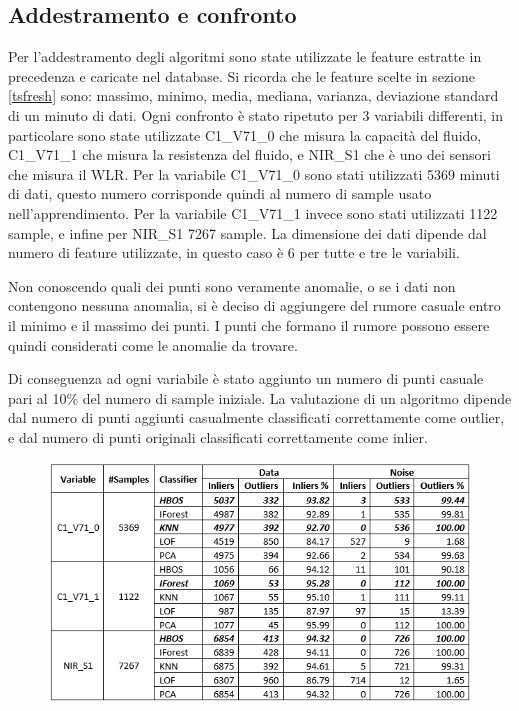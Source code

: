 \subsection{Addestramento e confronto} \label{AddestramentoEConfronto}

Per l'addestramento degli algoritmi sono state utilizzate le feature estratte in precedenza e caricate nel database. Si ricorda che le feature scelte in sezione \ref{tsfresh} sono: massimo, minimo, media, mediana, varianza, deviazione standard di un minuto di dati. Ogni confronto è stato ripetuto per 3 variabili differenti, in particolare sono state utilizzate C1\_V71\_0 che misura la capacità del fluido, C1\_V71\_1 che misura la resistenza del fluido, e NIR\_S1 che è uno dei sensori che misura il WLR.
Per la variabile C1\_V71\_0 sono stati utilizzati 5369 minuti di dati, questo numero corrisponde quindi al numero di sample usato nell'apprendimento. Per la variabile C1\_V71\_1 invece sono stati utilizzati 1122 sample, e infine per NIR\_S1 7267 sample.
La dimensione dei dati dipende dal numero di feature utilizzate, in questo caso è 6 per tutte e tre le variabili.

Non conoscendo quali dei punti sono veramente anomalie, o se i dati non contengono nessuna anomalia, si è deciso di aggiungere del rumore casuale entro il minimo e il massimo dei punti. I punti che formano il rumore possono essere quindi considerati come le anomalie da trovare. 

Di conseguenza ad ogni variabile è stato aggiunto un numero di punti casuale pari al 10\% del numero di sample iniziale. La valutazione di un algoritmo dipende dal numero di punti aggiunti casualmente classificati correttamente come outlier, e dal numero di punti originali classificati correttamente come inlier.

\begin{figure} [H]
	\includegraphics[width=\textwidth]{figures/homogeneous_noise}
		
\end{figure}

